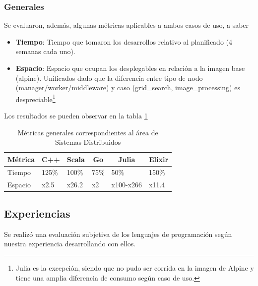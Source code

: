 \documentclass[11pt]{article}
\let\Oldsubsection\subsection
\renewcommand{\subsection}{\FloatBarrier\Oldsubsection}
\let\Oldsubsubsection\subsubsection
\renewcommand{\subsubsection}{\FloatBarrier\Oldsubsubsection}
\begin{document}
\subsubsection{Generales}

Se evaluaron, además, algunas métricas aplicables a ambos casos de uso, a saber

\begin{itemize}
    \item \textbf{Tiempo}: Tiempo que tomaron los desarrollos relativo al planificado (4 semanas cada uno).
    \item \textbf{Espacio}: Espacio que ocupan los desplegables en relación a la imagen base (alpine). Unificados dado que la diferencia entre tipo de nodo (manager/worker/middleware) y caso (grid\_search, image\_processing) es despreciable\footnote{Julia es la excepción, siendo que no pudo ser corrida en la imagen de Alpine y tiene una amplia diferencia de consumo según caso de uso.}
\end{itemize}

Los resultados se pueden observar en la tabla \ref{tab:sis_dist:general_metrics}

\begin{table}
\centering
\begin{tabular}{|l|l|l|l|l|l|}
\hline
\multicolumn{1}{|c|}{Métrica} & \multicolumn{1}{c|}{C++} & \multicolumn{1}{c|}{Scala} & \multicolumn{1}{c|}{Go} & \multicolumn{1}{c|}{Julia} & \multicolumn{1}{c|}{Elixir} \\ \hline
Tiempo                        & 125\%                    & 100\%                      & 75\%                    & 50\%                       & 150\%                       \\ \hline
Espacio                       & x2.5                     & x26.2                      & x2                      & x100-x266                  & x11.4                       \\ \hline
\end{tabular}
\caption{Métricas generales correspondientes al área de Sistemas Distribuidos}
\label{tab:sis_dist:general_metrics}
\end{table}

\subsection{Experiencias}

Se realizó una evaluación subjetiva de los lenguajes de programación según nuestra experiencia desarrollando con ellos.
\end{document}
